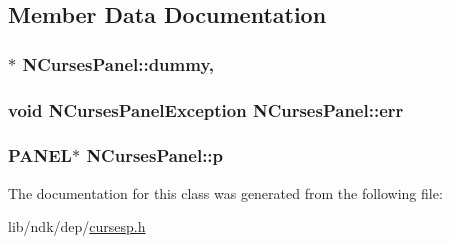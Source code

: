 \subsection{Member Data Documentation}
\hypertarget{class_n_curses_panel_a905442933927c1a758274e5d17dd65cb}{
\subsubsection[{dummy}]{$\ast$ N\-Curses\-Panel\-::dummy\hspace{0.3cm}{\ttfamily [static]}, {\ttfamily [protected]}}}\label{class_n_curses_panel_a905442933927c1a758274e5d17dd65cb}
\hypertarget{class_n_curses_panel_a36889096b2df7770196fa535c6333068}{
\subsubsection[{err}]{\setlength{\rightskip}{0pt plus 5cm}void N\-Curses\-Panel\-Exception N\-Curses\-Panel\-::err\hspace{0.3cm}{\ttfamily [protected]}}}\label{class_n_curses_panel_a36889096b2df7770196fa535c6333068}
\hypertarget{class_n_curses_panel_a222da97e5dca710840d6a10fbb9dfc90}{
\subsubsection[{p}]{\setlength{\rightskip}{0pt plus 5cm}P\-A\-N\-E\-L$\ast$ N\-Curses\-Panel\-::p\hspace{0.3cm}{\ttfamily [protected]}}}\label{class_n_curses_panel_a222da97e5dca710840d6a10fbb9dfc90}


The documentation for this class was generated from the following file\-:\begin{DoxyCompactItemize}
\item 
lib/ndk/dep/\hyperlink{cursesp_8h}{cursesp.\-h}\end{DoxyCompactItemize}
